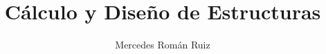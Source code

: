 \documentclass[10pt, a4paper, twoside, twocolumn]{book}
\title{Cálculo y Diseño de Estructuras}
\author{Mercedes Román Ruiz}
\date{}
\begin{document}
\sloppy 
\setlength{\parindent}{15pt} %
\setlength{\parskip}{5pt} %
\renewcommand\thesection{\arabic{section}}
\renewcommand{\baselinestretch}{1.5}
\renewcommand{\listtablename}{Índice de tablas} %
\renewcommand{\tablename}{Tabla} %
\renewcommand{\baselinestretch}{1.5}

\fancyhead{}
\fancyfoot{}
\pagestyle{fancy}
\chead[\rightmark]{\leftmark}

\fancyfoot[LE,RO]{\thepage}



%

%



\end{document}
